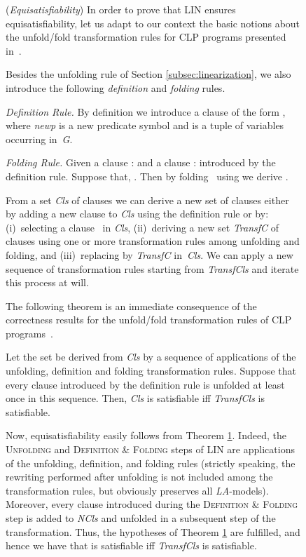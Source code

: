 \documentclass[english]{tlp}
\begin{document}
\begin{figure}[ht]
\begin{flushleft}
\begin{minipage}{124mm}
\smallskip
\noindent
({\it Equisatisfiability}) 
In order to prove that LIN ensures equisatisfiability, let us 
adapt to our context the basic notions about the unfold/fold 
transformation rules for CLP programs presented in~\cite{EtG96}.

Besides the unfolding rule of Section \ref{subsec:linearization}, 
we also introduce the following {\it definition} and {\it folding} rules.

\smallskip

\noindent
{\it Definition Rule.}  By definition we 
introduce a clause of the form \mbox{}, 
where \textit{newp} is a new predicate symbol and
 is a tuple of variables occurring in~\textit{G}.

\smallskip

\noindent
{\it Folding Rule.} 
Given a clause :  and 
a clause :  introduced by the definition rule.
Suppose that, .
Then by folding~ using  we derive .

\smallskip

From a set {\it Cls} of clauses
we can derive a new set  of clauses either by
adding a new clause to {\it Cls} using the definition rule or by: 
(i)~selecting a clause~ in {\it Cls},
(ii)~deriving a new set \textit{TransfC} of clauses using
one or more transformation rules among unfolding and folding, and
(iii)~replacing  by \textit{TransfC} in~{\it Cls}.
We can apply a new sequence of transformation rules
starting from \textit{TransfCls} and iterate this process at will.

The following theorem is an immediate consequence of the correctness results 
for the unfold/fold transformation rules of CLP programs~\cite{EtG96}. 

\begin{theorem}
\label{thm:corr_rules}
Let the set  be derived from {\it Cls} by a sequence
of applications of the unfolding, definition and folding transformation rules. 
Suppose that every clause introduced by the definition
rule is unfolded at least once in this sequence.
Then, {\it Cls} is satisfiable \mbox{iff}
{\it TransfCls} is satisfiable.
\end{theorem}

Now, equisatisfiability easily follows from 
Theorem \ref{thm:corr_rules}. Indeed, the \textsc{Unfolding} and
\textsc{Definition \& Folding} steps of LIN
are applications of the unfolding, definition, and folding rules
(strictly speaking, the rewriting performed after unfolding is not included 
among the transformation rules, but obviously preserves all {\it LA}-models). 
Moreover, every clause introduced during the \textsc{Definition \& Folding} step
is added to {\it NCls} and unfolded in a subsequent step of the transformation.
Thus, the hypotheses of Theorem \ref{thm:corr_rules} are fulfilled, and hence
we have that  is satisfiable iff
\textit{TransfCls} is satisfiable. \hfill 



\end{minipage}
\end{flushleft}
\end{figure}
\end{document}

